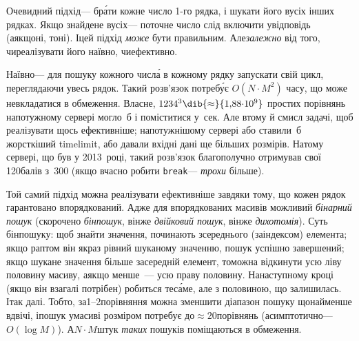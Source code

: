 \Tutorial	
Очевидний підхід\nolinebreak[3] --- бр\'{а}ти кожне число \mbox{1-го} рядка, і шукати його в\nolinebreak[3] усіх інших рядках. Якщо знайдене в\nolinebreak[3] усіх\nolinebreak[3] --- поточне число слід включити у\nolinebreak[3] відповідь (а\nolinebreak[3] якщо\nolinebreak[2] ні, то\nolinebreak[3] ні).
І\nolinebreak[3] цей підхід \emph{може} бути правильним. Але\nolinebreak[2] \emph{залежно} від того, чи\nolinebreak[3] реалізувати його наївно, чи\nolinebreak[3] ефективно. 

Наївно\nolinebreak[3] --- для пошуку кожного числ\'{а} в кожному рядку запускати свій цикл, переглядаючи увесь рядок. Такий розв'язок потреб\'{у}є $O(N{\cdot}M^2)$ часу, що може не\nolinebreak[3] вкладатися в обмеження. Власне, $1234^3\dib{{\approx}}{1{,}88{\cdot}10^9}$ простих порівнянь на\nolinebreak[2] потужному сервері могло~б і поміститися у~сек. Але в\nolinebreak[3] тому й смисл задачі, щоб реалізувати щось ефективніше; на\nolinebreak[3] потужнішому сервері або ставили~б жорсткіший time\nolinebreak[2] limit, або давали вхідні дані ще більших розмірів. На\nolinebreak[3] тому сервері, що був у 2013~році, такий розв'язок благополучно отримував свої 120\nolinebreak[3] балів з~300 (якщо вчасно робити \texttt{break}\nolinebreak[3] --- \emph{трохи} більше).

Той самий підхід можна реалізувати ефективніше завдяки тому, що кожен рядок гарантовано впорядкований. Адже для впорядкованих масивів можливий \emph{бінарний пошук} (скорочено \emph{бін\-пошук}, він\nolinebreak[3] же \emph{двійковий пошук}, він\nolinebreak[3] же \emph{дихотомія}).\label{text:omnipresent-numbers-binsearch} Суть бінпошуку: щоб знайти значення, починають з\nolinebreak[3] середнього (за\nolinebreak[3] індексом) елемента; якщо раптом він якраз рівний шуканому значенню, пошук успішно завершений; якщо шукане значення більше за\nolinebreak[3] середній елемент, то\nolinebreak[3] можна відкинути усю ліву половину масиву, а\nolinebreak[3] якщо менше~--- усю праву половину. На\nolinebreak[3] наступному кроці (якщо він взагалі потрібен) робиться те\nolinebreak[3] с\'{а}ме, але з половиною, що залишилась. І\nolinebreak[3] так далі. Тобто, за\nolinebreak[2] \mbox{1--2}\nolinebreak[2] порівняння можна зменшити діапазон пошуку щонайменше вдвічі, і\nolinebreak[2] пошук у\nolinebreak[2] масиві розміром потребує до\nolinebreak[2] ${\approx}20$\nolinebreak[3] порівнянь (асимптотично\nolinebreak[3] --- $O(\log{}M)$). А\nolinebreak[3] $N{\cdot}M$\nolinebreak[2] штук \emph{таких} пошуків поміщаються в обмеження. 

